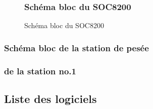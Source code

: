 \documentclass[10pt,a4paper,final]{article}
\begin{document}
\begin{spacing}{1.5}
\begin{figure}[hbtp]
\subsubsection{Schéma bloc du SOC8200}
\caption{Schéma bloc du SOC8200}
\centering
{}
\end{figure}

\vfill
\pagebreak

\subsubsection{Schéma bloc de la station de pesée}

\vfill
\pagebreak

\subsubsection{de la station no.1}

\subsection{Liste des logiciels}
\begin{flushleft}
\HRule
\end{flushleft}
\begin{flushleft}


\end{flushleft}
\end{spacing}
\end{document}
